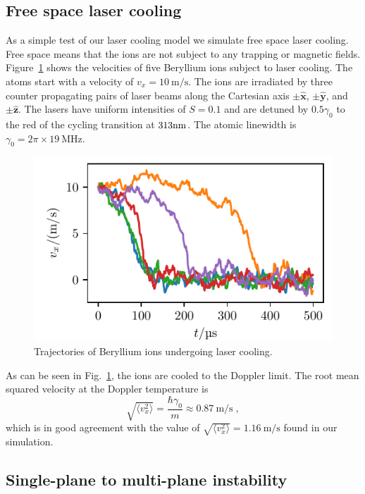 \documentclass[aps, pra, preprint]{revtex4-1}
\begin{document}
\subsection{Free space laser cooling}

As a simple test of our laser cooling model we simulate free
space laser cooling. Free space means that the ions are not
subject to any trapping or magnetic fields.
Figure~\ref{fig:FreeSpaceCooling} shows the velocities of five
Beryllium ions subject to laser cooling. The atoms start with a
velocity of $v_x=\SI{10}{\meter/\second}$. The ions are
irradiated by three counter propagating pairs of laser beams
along the Cartesian axis $\pm\hat{\mathbf{x}}$,
$\pm\hat{\mathbf{y}}$, and $\pm\hat{\mathbf{z}}$. The lasers have
uniform intensities of $S=0.1$ and are detuned by $0.5\gamma_0$
to the red of the cycling transition at $313{\rm nm}$. The atomic
linewidth is $\gamma_0=2\pi\times \SI{19}{\mega\hertz}$.

\begin{figure}
  \includegraphics{./figures/fig_laser_cooling.pdf}
  \caption{Trajectories of Beryllium ions undergoing laser
    cooling.}
  \label{fig:FreeSpaceCooling}
\end{figure}
As can be seen in Fig.~\ref{fig:FreeSpaceCooling}, the ions are
cooled to the Doppler limit. The root mean squared velocity at the Doppler
temperature is
\begin{equation}
\sqrt{\langle v_x^2\rangle} = \frac{\hbar \gamma_0}{m} \approx
\SI{0.87}{\meter/\second}\;,
\end{equation}
which is in good agreement with the value of $\sqrt{\langle
  v_x^2\rangle}=\SI{1.16}{\meter/\second}$ found in our
simulation.


\subsection{Single-plane to multi-plane instability}
\label{sec:validation}
\end{document}
